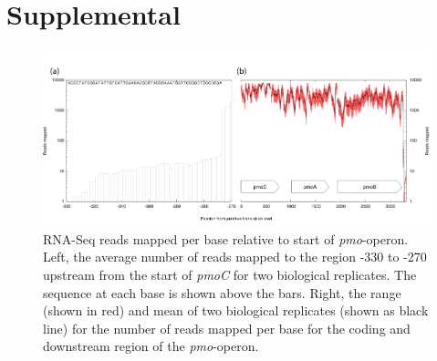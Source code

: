 \chapter{Supplemental}


\begin{figure}[H]
\centering
     \includegraphics[width=1.0\textwidth]{./tex/chapter1/figures/supplemental/FigureS1.png}
     \begin{singlespace}
     \caption[RNA-Seq reads mapped per base relative to start of \textit{pmo}-operon]{
        RNA-Seq reads mapped per base relative to start of \textit{pmo}-operon.
        Left, the average number of reads mapped to the region -330 to -270 upstream from the start of \textit{pmoC} for two biological replicates.
        The sequence at each base is shown above the bars.
        Right, the range (shown in red) and mean of two biological replicates (shown as black line) for the number of reads mapped per base for the coding and downstream region of the \textit{pmo}-operon.}
     \label{fig:S1} %
     \end{singlespace}
\end{figure}

